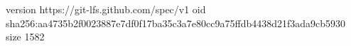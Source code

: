 version https://git-lfs.github.com/spec/v1
oid sha256:aa4735b2f0023887e7df0f17ba35c3a7e80cc9a75ffdb4438d21f3ada9cb5930
size 1582
